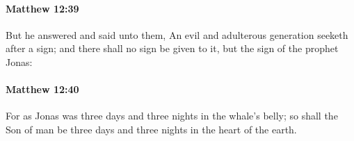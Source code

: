 		\paragraph{Matthew 12:39} %
			\label{MATTHEW-12-39}

			But he answered and said unto them, An evil and adulterous generation seeketh after a sign; and there shall no sign be given to it, but the sign of the prophet Jonas:

			\begin{framed}
			\scriptsize
				\begin{compactdesc}
					\item[SBLG] 
				\end{compactdesc}
			\end{framed}

		\paragraph{Matthew 12:40} %
			\label{MATTHEW-12-40}

			For as Jonas was three days and three nights in the whale's belly; so shall the Son of man be three days and three nights in the heart of the earth.

